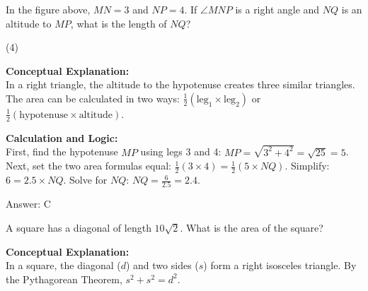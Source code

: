 \documentclass[11pt,paper=a4,answers]{exam}
\begin{document}
\begin{questions}
\question
\begin{center}
\end{center}
In the figure above, $MN = 3$ and $NP = 4$. If $\angle MNP$ is a right angle and $NQ$ is an altitude to $MP$, what is the length of $NQ$?
\begin{tasks}(4)
\end{tasks}

\begin{solution}
\textbf{Conceptual Explanation:} \\
In a right triangle, the altitude to the hypotenuse creates three similar triangles. The area can be calculated in two ways: $\frac{1}{2}(\text{leg}_1 \times \text{leg}_2)$ or $\frac{1}{2}(\text{hypotenuse} \times \text{altitude})$.

\vspace{30pt}

\textbf{Calculation and Logic:} \\
First, find the hypotenuse $MP$ using legs 3 and 4: $MP = \sqrt{3^2 + 4^2} = \sqrt{25} = 5$. Next, set the two area formulas equal: $\frac{1}{2}(3 \times 4) = \frac{1}{2}(5 \times NQ)$. Simplify: $6 = 2.5 \times NQ$. Solve for $NQ$: $NQ = \frac{6}{2.5} = 2.4$.

\vspace{30pt}

Answer: \colorbox{yellow!100}{C}
\end{solution}

\vspace{60pt}

\question
A square has a diagonal of length $10\sqrt{2}$. What is the area of the square?

\begin{solution}
\textbf{Conceptual Explanation:} \\
In a square, the diagonal ($d$) and two sides ($s$) form a right isosceles triangle. By the Pythagorean Theorem, $s^2 + s^2 = d^2$.


\end{solution}
\end{questions}
\end{document}
